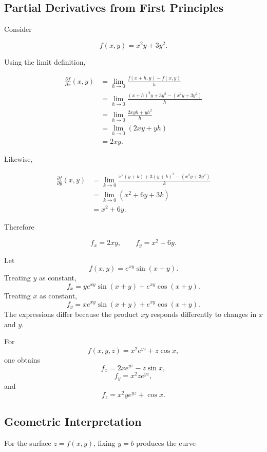 \subsection{Partial Derivatives from First Principles}

Consider

\[
f(x,y)=x^2y+3y^2.
\]

Using the limit definition,

\begin{align*}
\frac{\partial f}{\partial x}(x,y)
&=
\lim_{h\to0}
\frac{f(x+h,y)-f(x,y)}{h}\\
&=
\lim_{h\to0}
\frac{(x+h)^2y+3y^2-(x^2y+3y^2)}{h}\\
&=
\lim_{h\to0}
\frac{2xyh+yh^2}{h}\\
&=
\lim_{h\to0}(2xy+yh)\\
&=2xy.
\end{align*}

Likewise,

\begin{align*}
\frac{\partial f}{\partial y}(x,y)
&=
\lim_{k\to0}
\frac{x^2(y+k)+3(y+k)^2-(x^2y+3y^2)}{k}\\
&=
\lim_{k\to0}
\left(x^2+6y+3k\right)\\
&=x^2+6y.
\end{align*}

Therefore

\[
\boxed{
f_x=2xy,
\qquad
f_y=x^2+6y.
}
\]

\begin{bookexample}
Let
\[
f(x,y)=e^{xy}\sin(x+y).
\]
Treating $y$ as constant,
\[
f_x
=
ye^{xy}\sin(x+y)+e^{xy}\cos(x+y).
\]
Treating $x$ as constant,
\[
f_y
=
xe^{xy}\sin(x+y)+e^{xy}\cos(x+y).
\]
The expressions differ because the product $xy$ responds differently to changes in $x$ and $y$.
\end{bookexample}

\begin{bookexample}
For
\[
f(x,y,z)=x^2e^{yz}+z\cos x,
\]
one obtains
\[
f_x=2xe^{yz}-z\sin x,
\]
\[
f_y=x^2ze^{yz},
\]
and
\[
f_z=x^2ye^{yz}+\cos x.
\]
\end{bookexample}

\subsection{Geometric Interpretation}

For the surface $z=f(x,y)$, fixing $y=b$ produces the curve

